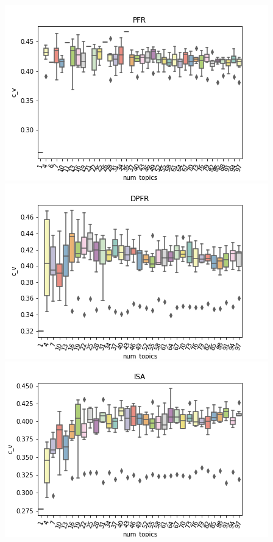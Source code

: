 \documentclass{article}
\begin{document}
\begin{multicols}{2}
\includegraphics[width=\columnwidth]{../images/PFR_c_v.png}
\includegraphics[width=\columnwidth]{../images/DPFR_c_v.png}
\includegraphics[width=\columnwidth]{../images/ISA_c_v.png}



\end{multicols}
\end{document}
